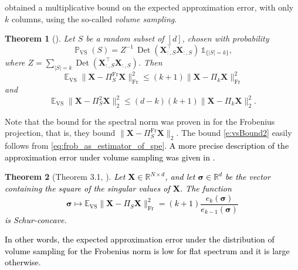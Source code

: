 \documentclass[twoside,11pt]{book}
\newcommand{\rev}[1]{\textcolor{black}{#1}}
\newtheorem{theorem}{Theorem}
\numberwithin{theorem}{chapter}
\numberwithin{definition}{chapter}
\numberwithin{proposition}{chapter}
\numberwithin{corollary}{chapter}
\numberwithin{example}{chapter}
\numberwithin{lemma}{chapter}
\numberwithin{assumption}{chapter}
\numberwithin{equation}{chapter}
\numberwithin{figure}{chapter}
\DeclareMathOperator{\Det}{Det}
\DeclareMathOperator{\Fr}{\mathrm{Fr}}
\DeclareMathOperator{\VS}{\mathrm{VS}}
\DeclareMathOperator{\Tran}{\intercal}
\DeclareMathOperator{\EX}{\mathbb{E}}
\DeclareMathOperator{\Prb}{\mathbb{P}}
\begin{document}
 \citet*{DRVW06} obtained a multiplicative bound on the expected approximation error, with only $k$ columns, using the so-called \emph{volume sampling}.
\begin{theorem}[\citealp{DRVW06}]
  \label{thrm:volume_sampling_theorem}
Let $S$ be a random subset of $[d]$, chosen with probability
\begin{equation}
\Prb_{\VS}(S) = Z^{-1} \,\Det(\bm{X}_{:,S}^{\Tran}\bm{X}_{:,S}^{})\, \mathbb{1}_{\{|S| = k \}},
\label{e:vs}
\end{equation}
where $Z = \sum\limits_{|S| = k} \Det(\bm{X}_{:,S}^{\Tran}\bm{X}_{:,S}^{})$.
Then
\begin{equation}
\EX_{\VS} \| \bm{X} - \Pi_{S}^{\Fr}\bm{X} \|_{\Fr}^{2} \leq (k+1)\| \bm{X} - \Pi_{k}\bm{X} \|_{\Fr}^{2}
\label{e:vsBoundFr}
\end{equation}
and
\begin{equation}
\EX_{\VS} \| \bm{X} - \Pi_{S}^{2}\bm{X} \|_{2}^{2} \leq (d-k)(k+1)\| \bm{X} - \Pi_{k}\bm{X} \|_{2}^{2} .
\label{e:vsBound2}
\end{equation}
\end{theorem}
Note that the bound for the spectral norm was proven in \cite{DRVW06} for the Frobenius projection, that is, they bound $\| \bm{X} - \Pi_{S}^{\Fr}\bm{X} \|_{2}$. The bound \eqref{e:vsBound2} easily follows from \eqref{eq:frob_as_estimator_of_spe}. \rev{A more precise description of the approximation error under volume sampling was given in \cite{GuSi12}.}
\begin{theorem}[Theorem 3.1, \citealp{GuSi12}]\label{thm:schur_convex_volume_sampling}
\rev{Let $\bm{X} \in \mathbb{R}^{N \times d}$, and let $\bm{\sigma}\in \mathbb{R}^{d}$ be the vector containing the square of the singular values of $\bm{X}$. The function
\begin{equation}
\bm{\sigma} \mapsto \mathbb{E}_{\VS} \|\bm{X}- \Pi_{S} \bm{X}\|_{\Fr}^{2} = (k+1)\frac{e_{k}(\bm{\sigma})}{e_{k-1}(\bm{\sigma})}
\end{equation}
is Schur-concave.}
\end{theorem}
\rev{In other words, the expected approximation error under the distribution of volume sampling for the Frobenius norm is low for flat spectrum and it is large otherwise.}
\end{document}
